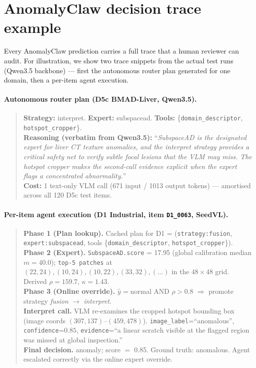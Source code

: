 \section{AnomalyClaw decision trace example}
\label{app:trace}

Every AnomalyClaw prediction carries a full trace that a human reviewer can audit. For illustration, we show two trace snippets from the actual test runs (Qwen3.5 backbone) — first the autonomous router plan generated for one domain, then a per-item agent execution.

\paragraph{Autonomous router plan (D5c BMAD-Liver, Qwen3.5).}
\begin{quote}\small
\textbf{Strategy:} interpret. \textbf{Expert:} subspacead. \textbf{Tools:} \{\texttt{domain\_descriptor}, \texttt{hotspot\_cropper}\}.\\[2pt]
\textbf{Reasoning (verbatim from Qwen3.5):} ``\emph{SubspaceAD is the designated expert for liver CT texture anomalies, and the interpret strategy provides a critical safety net to verify subtle focal lesions that the VLM may miss. The hotspot cropper makes the second-call evidence explicit when the expert flags a concentrated abnormality.}''\\[2pt]
\textbf{Cost:} 1 text-only VLM call (671 input / 1013 output tokens) — amortised across all 120 D5c test items.
\end{quote}

\paragraph{Per-item agent execution (D1 Industrial, item \texttt{D1\_0063}, SeedVL).}
\begin{quote}\small
\textbf{Phase 1 (Plan lookup).} Cached plan for D1 = (\texttt{strategy:fusion}, \texttt{expert:subspacead}, tools \{\texttt{domain\_descriptor}, \texttt{hotspot\_cropper}\}).\\[2pt]
\textbf{Phase 2 (Expert).} \texttt{SubspaceAD.score} = 17.95 (global calibration median $m{=}40.0$); \texttt{top-5 patches} at $(22,24), (10,24), (10,22), (33,32), (\ldots)$ in the $48{\times}48$ grid. Derived $\rho = 159.7$, $\kappa = 1.43$.\\[2pt]
\textbf{Phase 3 (Online override).} $\hat{y}_{\mathrm{}}{=}$normal AND $\rho > 0.8$ $\Rightarrow$ promote strategy \emph{fusion} $\to$ \emph{interpret}.\\[2pt]
\textbf{Interpret call.} VLM re-examines the cropped hotspot bounding box (image coords $(307, 137)$--$(459, 478)$). \texttt{image\_label}=``anomalous'', \texttt{confidence}=$0.85$, \texttt{evidence}=``a linear scratch visible at the flagged region was missed at global inspection.''\\[2pt]
\textbf{Final decision.} anomaly; score $=$ 0.85. Ground truth: anomalous. Agent escalated correctly via the online expert override.
\end{quote}

